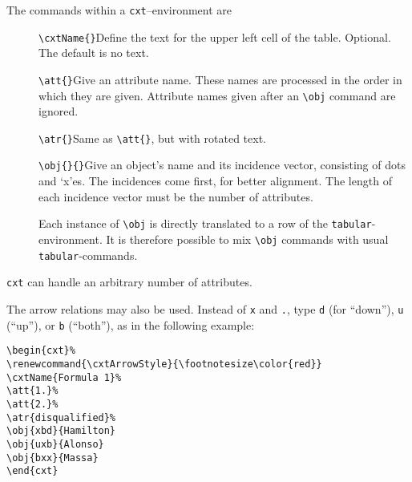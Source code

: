 \documentclass[12pt]{article}
\begin{document}
The commands within a \texttt{cxt}--environment are

\begin{description}
\item[]\verb|\cxtName{}|\quad Define the text for the upper left cell of the
  table. Optional. The default is no text.
\item[]\verb|\att{}|\quad Give an attribute name. These names are processed
  in the order in which they are given. Attribute names given after an
  \verb|\obj|  command are ignored.
\item[]\verb|\atr{}|\quad Same as \verb|\att{}|, but with rotated text.
\item[]\verb|\obj{}{}|\quad Give an object's name and its incidence vector,
  consisting of dots and `x'es. The incidences come first, for better
  alignment. The length of each incidence vector must be the number of
  attributes. 

Each  instance of \verb|\obj| is directly translated to a row of the
\verb|tabular|-environment. It is therefore possible to mix  \verb|\obj|
commands with usual  \verb|tabular|-commands.
\end{description}
\texttt{cxt} can handle an arbitrary number of attributes.
\bigbreak

The arrow relations may also be used. Instead of \texttt{x} and \texttt{.},
type \texttt{d} (for ``down''), \texttt{u} (``up''), or \texttt{b} (``both''), 
as in the following example:\bigbreak 

\noindent\begin{minipage}{.45\textwidth}
\begin{verbatim}
\begin{cxt}%
\renewcommand{\cxtArrowStyle}{\footnotesize\color{red}}
\cxtName{Formula 1}%
\att{1.}%
\att{2.}%
\atr{disqualified}%
\obj{xbd}{Hamilton}
\obj{uxb}{Alonso}
\obj{bxx}{Massa}
\end{cxt}
\end{verbatim}
\end{minipage}
\hfill
\begin{minipage}{.40\textwidth}
\strut\par\strut\par
\begin{cxt}%
\renewcommand{\cxtArrowStyle}{\footnotesize\color{red}}
%
%
%
%
\end{cxt}
\end{minipage}
\bigbreak
\end{document}
